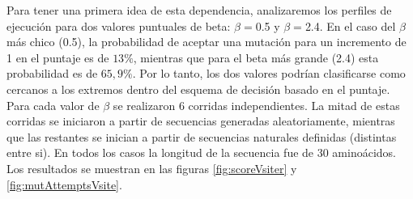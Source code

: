 Para tener una primera idea de esta dependencia, analizaremos los perfiles de ejecución para dos valores puntuales de beta: $\beta=$0.5 y $\beta=$2.4.
En el caso del $\beta$ más chico (0.5), la probabilidad de aceptar una mutación para un incremento de 1 en el puntaje es de $13\%$, mientras que para el beta más grande (2.4) esta probabilidad es de $65,9\%$.
Por lo tanto, los dos valores podrían clasificarse como cercanos a los extremos dentro del esquema de decisión basado en el puntaje.
Para cada valor de $\beta$ se realizaron 6 corridas independientes.
La mitad de estas corridas se iniciaron a partir de secuencias generadas aleatoriamente, mientras que las restantes se inician a partir de secuencias naturales definidas (distintas entre si).
En todos los casos la longitud de la secuencia fue de 30 aminoácidos. Los resultados se muestran en las figuras \ref{fig:scoreVsiter} y \ref{fig:mutAttemptsVsite}.




% 
% 


